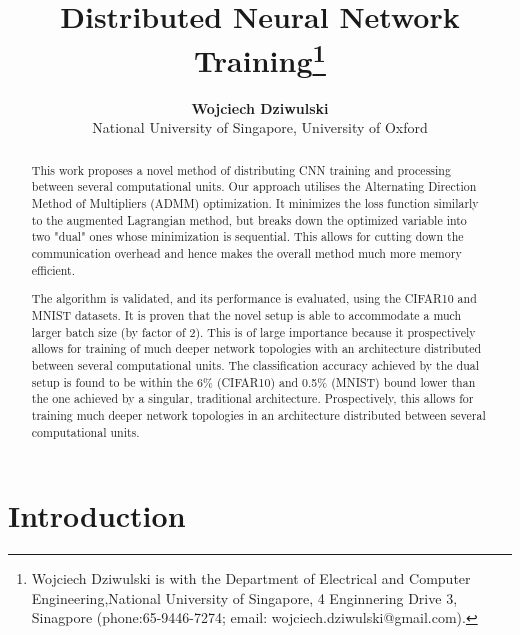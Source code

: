 \documentclass[conference]{IEEEtran}
\begin{document}
\title{\ \\ \LARGE\bf Distributed Neural Network Training\thanks{Wojciech Dziwulski is with the
Department of Electrical and Computer Engineering,National University of Singapore, 4 Enginnering Drive 3, Sinagpore
(phone:65-9446-7274; email: wojciech.dziwulski@gmail.com).}
}

\author{\textbf{Wojciech Dziwulski} \\ National University of Singapore, University of Oxford}

\maketitle

\begin{abstract}
This work proposes a novel method of distributing CNN training and processing between several computational units. Our approach utilises the Alternating Direction Method of Multipliers (ADMM) optimization. It minimizes the loss function similarly to the augmented Lagrangian method, but breaks down the optimized variable into two "dual" ones whose minimization is sequential. This allows for cutting down the communication overhead and hence makes the overall method much more memory efficient.

The algorithm is validated, and its performance is evaluated, using the CIFAR10 and MNIST datasets. 
It is proven that the novel setup is able to accommodate a much larger batch size (by factor of 2). This is of large importance because it prospectively allows for training of much deeper network topologies with an architecture distributed between several computational units. The classification accuracy achieved by the dual setup is found to be within the 6\% (CIFAR10) and 0.5\% (MNIST) bound lower than the one achieved by a singular, traditional architecture. Prospectively, this allows for training much deeper network topologies in an architecture distributed between several computational units.
\end{abstract}


\section{Introduction}
\end{document}
